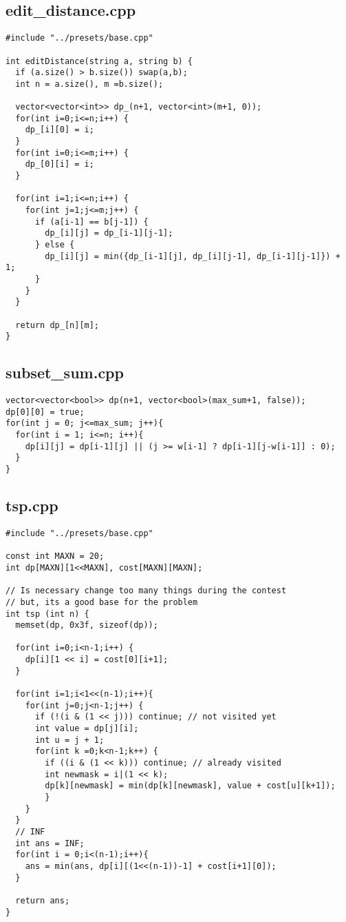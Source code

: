 \documentclass[11pt,landscape,twocolumn]{article}
\begin{document}
\subsection*{edit\_distance.cpp}
\begin{lstlisting}
#include "../presets/base.cpp"

int editDistance(string a, string b) {
  if (a.size() > b.size()) swap(a,b);
  int n = a.size(), m =b.size();

  vector<vector<int>> dp_(n+1, vector<int>(m+1, 0));
  for(int i=0;i<=n;i++) {
    dp_[i][0] = i;
  }
  for(int i=0;i<=m;i++) {
    dp_[0][i] = i;
  }
  
  for(int i=1;i<=n;i++) {
    for(int j=1;j<=m;j++) {
      if (a[i-1] == b[j-1]) {
        dp_[i][j] = dp_[i-1][j-1];
      } else {
        dp_[i][j] = min({dp_[i-1][j], dp_[i][j-1], dp_[i-1][j-1]}) + 1;
      }
    }
  }

  return dp_[n][m];
}

\end{lstlisting}

\subsection*{subset\_sum.cpp}
\begin{lstlisting}
vector<vector<bool>> dp(n+1, vector<bool>(max_sum+1, false));
dp[0][0] = true;
for(int j = 0; j<=max_sum; j++){
  for(int i = 1; i<=n; i++){
    dp[i][j] = dp[i-1][j] || (j >= w[i-1] ? dp[i-1][j-w[i-1]] : 0);
  }
}
\end{lstlisting}

\subsection*{tsp.cpp}
\begin{lstlisting}
#include "../presets/base.cpp"

const int MAXN = 20;
int dp[MAXN][1<<MAXN], cost[MAXN][MAXN];

// Is necessary change too many things during the contest
// but, its a good base for the problem
int tsp (int n) {
  memset(dp, 0x3f, sizeof(dp));

  for(int i=0;i<n-1;i++) {
    dp[i][1 << i] = cost[0][i+1];
  }

  for(int i=1;i<1<<(n-1);i++){
    for(int j=0;j<n-1;j++) {
      if (!(i & (1 << j))) continue; // not visited yet
      int value = dp[j][i];
      int u = j + 1;
      for(int k =0;k<n-1;k++) {
        if ((i & (1 << k))) continue; // already visited
        int newmask = i|(1 << k);
        dp[k][newmask] = min(dp[k][newmask], value + cost[u][k+1]);
        }
    }
  }
  // INF
  int ans = INF;
  for(int i = 0;i<(n-1);i++){
    ans = min(ans, dp[i][(1<<(n-1))-1] + cost[i+1][0]);
  }

  return ans;
}

\end{lstlisting}
\end{document}
